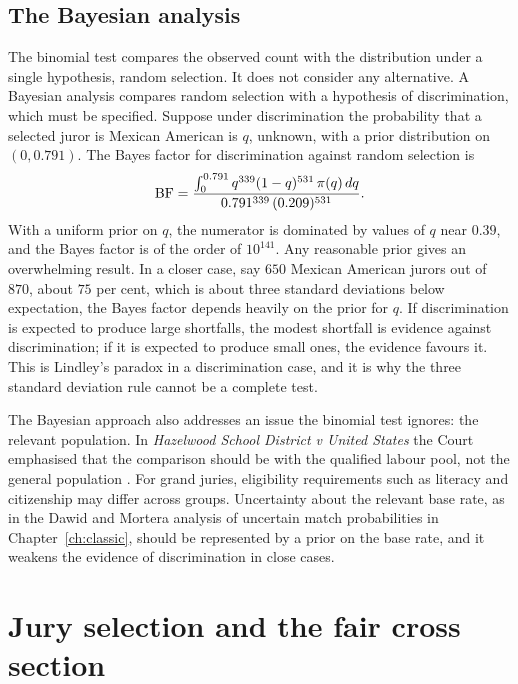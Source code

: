 \subsection{The Bayesian analysis}

The binomial test compares the observed count with the distribution under a single hypothesis, random selection. It does not consider any alternative. A Bayesian analysis compares random selection with a hypothesis of discrimination, which must be specified. Suppose under discrimination the probability that a selected juror is Mexican American is $q$, unknown, with a prior distribution on $(0, 0.791)$. The Bayes factor for discrimination against random selection is
\begin{equation}
\mathrm{BF} = \frac{\int_0^{0.791} q^{339}(1-q)^{531}\,\pi(q)\,dq}{0.791^{339}\,(0.209)^{531}}.
\end{equation}
With a uniform prior on $q$, the numerator is dominated by values of $q$ near $0.39$, and the Bayes factor is of the order of $10^{141}$. Any reasonable prior gives an overwhelming result. In a closer case, say $650$ Mexican American jurors out of $870$, about $75$ per cent, which is about three standard deviations below expectation, the Bayes factor depends heavily on the prior for $q$. If discrimination is expected to produce large shortfalls, the modest shortfall is evidence against discrimination; if it is expected to produce small ones, the evidence favours it. This is Lindley's paradox in a discrimination case, and it is why the three standard deviation rule cannot be a complete test.

The Bayesian approach also addresses an issue the binomial test ignores: the relevant population. In \emph{Hazelwood School District v United States} the Court emphasised that the comparison should be with the qualified labour pool, not the general population \citep{hazelwood1977}. For grand juries, eligibility requirements such as literacy and citizenship may differ across groups. Uncertainty about the relevant base rate, as in the Dawid and Mortera analysis of uncertain match probabilities in Chapter~\ref{ch:classic}, should be represented by a prior on the base rate, and it weakens the evidence of discrimination in close cases.

\section{Jury selection and the fair cross section}

